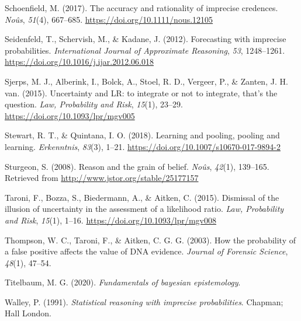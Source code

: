 \documentclass[
  10pt,
  dvipsnames,enabledeprecatedfontcommands]{scrartcl}
\newlength{\cslhangindent}
\newlength{\cslentryspacingunit} %
\newenvironment{CSLReferences}[2] %
 {%
  \setlength{\parindent}{0pt}
  \ifodd #1
  \let\oldpar\par
  \def\par{\hangindent=\cslhangindent\oldpar}
  \fi
  \setlength{\parskip}{#2\cslentryspacingunit}
 }%
 {}
\begin{document}
\begin{CSLReferences}{1}{0}
\leavevmode{}%
Schoenfield, M. (2017). The accuracy and rationality of imprecise
credences. \emph{Noûs}, \emph{51}(4), 667--685.
\url{https://doi.org/10.1111/nous.12105}

\leavevmode{}%
Seidenfeld, T., Schervish, M., \& Kadane, J. (2012). Forecasting with
imprecise probabilities. \emph{International Journal of Approximate
Reasoning}, \emph{53}, 1248--1261.
\url{https://doi.org/10.1016/j.ijar.2012.06.018}

\leavevmode{}%
Sjerps, M. J., Alberink, I., Bolck, A., Stoel, R. D., Vergeer, P., \&
Zanten, J. H. van. (2015). {Uncertainty and LR: to integrate or not to
integrate, that's the question}. \emph{Law, Probability and Risk},
\emph{15}(1), 23--29. \url{https://doi.org/10.1093/lpr/mgv005}

\leavevmode{}%
Stewart, R. T., \& Quintana, I. O. (2018). Learning and pooling, pooling
and learning. \emph{Erkenntnis}, \emph{83}(3), 1--21.
\url{https://doi.org/10.1007/s10670-017-9894-2}

\leavevmode{}%
Sturgeon, S. (2008). Reason and the grain of belief. \emph{No{û}s},
\emph{42}(1), 139--165. Retrieved from
\url{http://www.jstor.org/stable/25177157}

\leavevmode{}%
Taroni, F., Bozza, S., Biedermann, A., \& Aitken, C. (2015). {Dismissal
of the illusion of uncertainty in the assessment of a likelihood ratio}.
\emph{Law, Probability and Risk}, \emph{15}(1), 1--16.
\url{https://doi.org/10.1093/lpr/mgv008}

\leavevmode{}%
Thompson, W. C., Taroni, F., \& Aitken, C. G. G. (2003). How the
probability of a false positive affects the value of {DNA} evidence.
\emph{Journal of Forensic Science}, \emph{48}(1), 47--54.

\leavevmode{}%
Titelbaum, M. G. (2020). \emph{Fundamentals of bayesian epistemology}.

\leavevmode{}%
Walley, P. (1991). \emph{Statistical reasoning with imprecise
probabilities}. Chapman; Hall London.

\end{CSLReferences}
\end{document}
